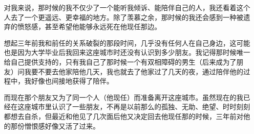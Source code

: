 对我来说，那时候的我不仅少了一个能听我倾诉、能陪伴自己的人，我还看着这个人去了一个更遥远、更幸福的地方。除了羡慕之余，那时候的我还会感到一种被遗弃的愤怒感，甚至希望他能够永远死在他现任那边。

想起三年前我和前任的关系破裂的那段时间，几乎没有任何人在自己身边，这可能也是因为大学毕业后我回来这座城市时还没有认识到多少朋友。我记得那时候唯一给自己提供支持的，只有我自己了\pozhehao{}那时候一个有双相障碍的男生（后来成为了朋友）问我要不要去他家陪他几天，我也就去了他家过了几天的夜，通过陪伴他的过程中，我好像也间接地获得了陪伴。

而现在那个朋友又为了同一个人（他现任）而准备离开这座城市。虽然现在的我已经在这座城市里认识了一些朋友，不再是以前那么的孤独、无助、绝望、时时刻刻都想去自杀，但最近和他见了几次面后他又决定回去他现任那的时候，三年前对他的那份憎恨感好像又活了过来。



